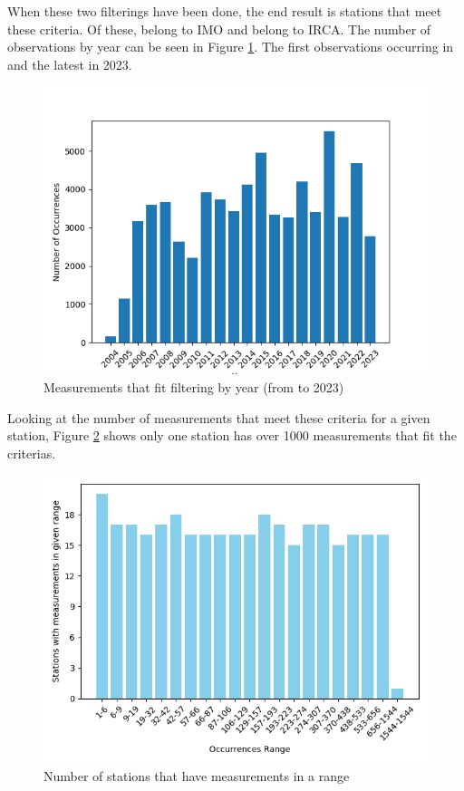 When these two filterings have been done, the end result is \nStationsMin stations that meet these criteria. Of these, \nVedurMin belong to IMO and \nVGMin belong to IRCA. The number of observations by year can be seen in Figure \ref{fig:occurrences_by_year}. The first observations occurring in \startDateVedur and the latest in 2023.

\begin{figure}
    \begin{center}
        \includegraphics[scale = 0.75]{Figures/occurrences_by_year.png}
    \end{center}
    \caption{Measurements that fit filtering by year (from \startDateVedur to 2023)}
    \label{fig:occurrences_by_year}
\end{figure}

Looking at the number of measurements that meet these criteria for a given station, Figure \ref{fig:occurrences_by_station_20} shows only one station has over 1000 measurements that fit the criterias.

\begin{figure}
    \begin{center}
        \includegraphics[scale = 0.75]{Figures/station_occurrences_20.png}        
    \end{center}
    \caption{Number of stations that have measurements in a range}
    \label{fig:occurrences_by_station_20}
\end{figure}

